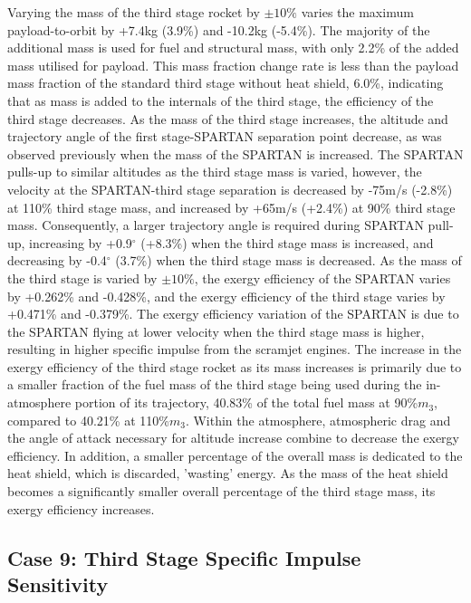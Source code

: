 Varying the mass of the third stage rocket by $\pm10\%$ varies the maximum payload-to-orbit by +7.4kg (3.9\%) and -10.2kg (-5.4\%). 
The majority of the additional mass is used for fuel and structural mass, with only 2.2\% of the added mass utilised for payload. This mass fraction change rate is less than the payload mass fraction of the standard third stage without heat shield, 6.0\%, indicating that as mass is added to the internals of the third stage, the efficiency of the third stage decreases.
 As the mass of the third stage increases, the altitude and trajectory angle of the first stage-SPARTAN separation point decrease, as was observed previously when the mass of the SPARTAN is increased. 
 The SPARTAN pulls-up to similar altitudes as the third stage mass is varied, however, the velocity at the SPARTAN-third stage separation is decreased by -75m/s (-2.8\%) at 110\% third stage mass, and increased by +65m/s (+2.4\%)  at 90\% third stage mass. 
 Consequently, a larger trajectory angle is required during SPARTAN pull-up, increasing by +0.9$^\circ$ (+8.3\%) when the third stage mass is increased, and decreasing by -0.4$^\circ$ (3.7\%) when the third stage mass is decreased. 
As the mass of the third stage is varied by $\pm10\%$, the exergy efficiency of the SPARTAN varies by +0.262\% and -0.428\%, and the exergy efficiency of the third stage varies by +0.471\% and -0.379\%. The exergy efficiency variation of the SPARTAN is due to the SPARTAN flying at lower velocity when the third stage mass is higher, resulting in higher specific impulse from the scramjet engines. 
The increase in the exergy efficiency of the third stage rocket as its mass increases is primarily due to a smaller fraction of the fuel mass of the third stage being used during the in-atmosphere portion of its trajectory, 40.83\% of the total fuel mass at 90\%$m_3$, compared to 40.21\% at 110\%$m_3$. Within the atmosphere, atmospheric drag and the angle of attack necessary for altitude increase combine to decrease the exergy efficiency.
In addition, a smaller percentage of the overall mass is dedicated to the heat shield, which is discarded, 'wasting' energy. As the mass of the heat shield becomes a significantly smaller overall percentage of the third stage mass, its exergy efficiency increases. 



\subsection{Case 9: Third Stage Specific Impulse Sensitivity}\label{sec:isp3NoReturn}

